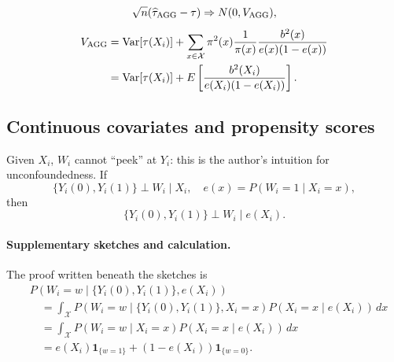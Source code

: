 \[
\sqrt n(\widehat\tau_{\rm AGG}-\tau)\Rightarrow N(0,V_{\rm AGG}),
\]
\begin{align*}
V_{\rm AGG}&=\operatorname{Var}[\tau(X_i)]
+\sum_{x\in\mathcal X}\pi^2(x)\frac1{\pi(x)}
\frac{b^2(x)}{e(x)(1-e(x))}\\
&=\operatorname{Var}[\tau(X_i)]
+E\left[\frac{b^2(X_i)}{e(X_i)(1-e(X_i))}\right].
\end{align*}
\subsection{Continuous covariates and propensity scores}
Given $X_i$, $W_i$ cannot ``peek'' at $Y_i$: this is the author's intuition for unconfoundedness. If
\[
\{Y_i(0),Y_i(1)\}\perp W_i\mid X_i,
\quad e(x)=P(W_i=1\mid X_i=x),
\]
then
\[
\{Y_i(0),Y_i(1)\}\perp W_i\mid e(X_i).
\]
\paragraph{Supplementary sketches and calculation.}
\begin{center}
\end{center}
The proof written beneath the sketches is
\begin{align*}
&P(W_i=w\mid\{Y_i(0),Y_i(1)\},e(X_i))\\
&\quad=\int_{\mathcal X}P(W_i=w\mid\{Y_i(0),Y_i(1)\},X_i=x)
 P(X_i=x\mid e(X_i))\,dx\\
&\quad=\int_{\mathcal X}P(W_i=w\mid X_i=x)P(X_i=x\mid e(X_i))\,dx\\
&\quad=e(X_i)\mathbf1_{\{w=1\}}+(1-e(X_i))\mathbf1_{\{w=0\}}.
\end{align*}
